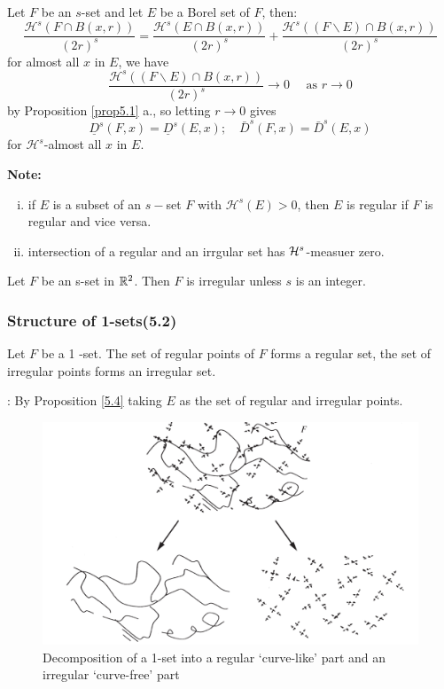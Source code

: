 \begin{proposition}\label{5.4}
    Let $F$ be an $s$-set and let $E$ be a Borel set of $F$, then:
    $$
\frac{\mathcal{H}^{s}(F \cap B(x, r))}{(2 r)^{s}}=\frac{\mathcal{H}^{s}(E \cap B(x, r))}{(2 r)^{s}}+\frac{\mathcal{H}^{s}((F \backslash E) \cap B(x, r))}{(2 r)^{s}}
$$
for almost all $x$ in $E$, we have
$$
\frac{\mathcal{H}^{s}((F \backslash E) \cap B(x, r))}{(2 r)^{s}} \rightarrow 0 \quad \text { as } r \rightarrow 0
$$
by Proposition \ref{prop5.1} a., so letting $r \rightarrow 0$ gives
$$
\underline{D}^{s}(F, x)=\underline{D}^{s}(E, x) ; \quad \bar{D}^{s}(F, x)=\bar{D}^{s}(E, x)
$$
for $\mathcal{H}^s$-almost all $x$ in $E$.
\end{proposition} 
\textbf{Note: } 
\begin{enumerate}[(i)]
    \item if $E$ is a subset of an $s-$set $F$ with $\mathcal{H}^s(E)>0$, then $E$ is regular if $F$ is regular and vice versa. 
    \item intersection of a regular and an irrgular set has $\mathcal{H}^s$-measuer zero. 
\end{enumerate}

\begin{theorem}
    Let $F$ be an s-set in $\mathbb{R}^2$. Then $F$ is irregular unless $s$ is an integer.
\end{theorem}

\newpage
\subsubsection{Structure of 1-sets(5.2)}
\begin{theorem}
    Let $F$ be a 1 -set. The set of regular points of $F$ forms a regular set, the set of irregular points forms an irregular set.
\end{theorem}
\proof: By Proposition \ref{5.4} taking $E$ as the set of regular and irregular points. 

\begin{figure}[H]
    \centering
    \includegraphics[width=.66\textwidth]{images/decomp1set.png}
    \caption{Decomposition of a 1-set into a regular ‘curve-like’ part and an irregular ‘curve-free’ part}
    \label{fig:decomp1set}
\end{figure}

